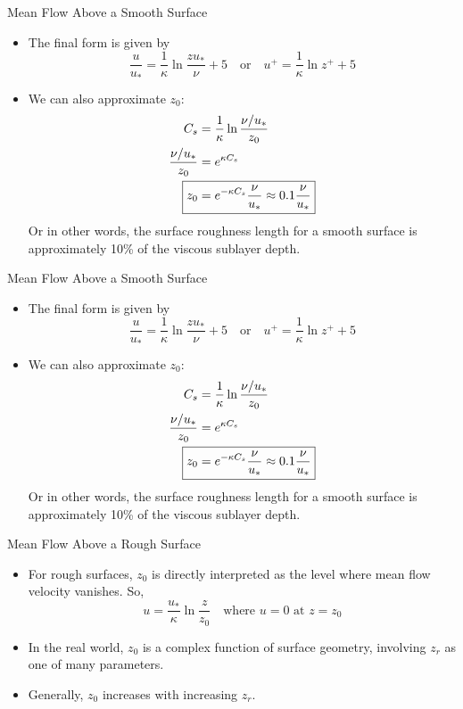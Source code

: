 \begin{frame}{Mean Flow Above a Smooth Surface}

\begin{itemize}
	\item The final form is given by
	$$\boxed{\frac{u}{u_*} = \frac{1}{\kappa}  \ln{\frac{zu_*}{\nu}} + 5} \quad \text{or} \quad \boxed{u^+ = \frac{1}{\kappa}  \ln{z^+} + 5}$$
	\item We can also approximate $z_0$:
	\begin{align*}
		C_s &= \frac{1}{\kappa} \ln{\frac{\nu / u_*}{z_0}}\\
		\frac{\nu / u_*}{z_0} &= e^{\kappa C_s}\\
		\Aboxed{z_0 &= e^{-\kappa C_s} \frac{\nu}{u_*} \approx 0.1 \frac{\nu}{u_*}}
	\end{align*}
	Or in other words, the surface roughness length for a smooth surface is approximately 10\% of the viscous sublayer depth.
\end{itemize}
\end{frame}
\begin{frame}{Mean Flow Above a Smooth Surface}

\begin{itemize}
	\item The final form is given by
	$$\boxed{\frac{u}{u_*} = \frac{1}{\kappa}  \ln{\frac{zu_*}{\nu}} + 5} \quad \text{or} \quad \boxed{u^+ = \frac{1}{\kappa}  \ln{z^+} + 5}$$
	\item We can also approximate $z_0$:
	\begin{align*}
		C_s &= \frac{1}{\kappa} \ln{\frac{\nu / u_*}{z_0}}\\
		\frac{\nu / u_*}{z_0} &= e^{\kappa C_s}\\
		\Aboxed{z_0 &= e^{-\kappa C_s} \frac{\nu}{u_*} \approx 0.1 \frac{\nu}{u_*}}
	\end{align*}
	Or in other words, the surface roughness length for a smooth surface is approximately 10\% of the viscous sublayer depth.
\end{itemize}
\end{frame}
\begin{frame}{Mean Flow Above a Rough Surface}

\begin{itemize}
	\item For rough surfaces, $z_0$ is directly interpreted as the level where mean flow velocity vanishes. So,
	$$u = \frac{u_*}{\kappa}\ln{\frac{z}{z_0}} \quad \text{where } u=0 \text{ at } z=z_0 $$
	\item In the real world, $z_0$ is a complex function of surface geometry, involving $z_r$ as one of many parameters.
	\item Generally, $z_0$ increases with increasing $z_r$.
\end{itemize}
\end{frame}
